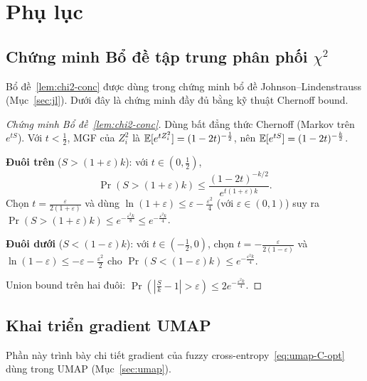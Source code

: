 \section{Phụ lục}

\subsection{Chứng minh Bổ đề tập trung phân phối $\chi^2$}
\label{app:chi2-proof}

Bổ đề~\ref{lem:chi2-conc} được dùng trong chứng minh bổ đề Johnson--Lindenstrauss (Mục~\ref{sec:jl}). Dưới đây là chứng minh đầy đủ bằng kỹ thuật Chernoff bound.

\begin{proof}[Chứng minh Bổ đề~\ref{lem:chi2-conc}]
Dùng bất đẳng thức Chernoff (Markov trên $e^{tS}$). Với $t < \frac{1}{2}$, MGF của $Z_i^2$ là $\mathbb{E}[e^{tZ_i^2}] = (1-2t)^{-\frac{1}{2}}$, nên $\mathbb{E}[e^{tS}] = (1-2t)^{-\frac{k}{2}}$.

\textbf{Đuôi trên} ($S > (1+\varepsilon)k$): với $t \in \left(0, \frac{1}{2}\right)$,
\[
\Pr(S > (1+\varepsilon)k) \leq \frac{(1-2t)^{-k/2}}{e^{t(1+\varepsilon)k}}.
\]
Chọn $t = \frac{\varepsilon}{2(1+\varepsilon)}$ và dùng $\ln(1+\varepsilon) \leq \varepsilon - \frac{\varepsilon^2}{4}$ (với $\varepsilon \in (0,1)$) suy ra $\Pr(S > (1+\varepsilon)k) \leq e^{-\frac{\varepsilon^2 k}{8}} \leq e^{-\frac{\varepsilon^2 k}{4}}$.

\textbf{Đuôi dưới} ($S < (1-\varepsilon)k$): với $t \in \left(-\frac{1}{2}, 0\right)$, chọn $t = -\frac{\varepsilon}{2(1-\varepsilon)}$ và $\ln(1-\varepsilon) \leq -\varepsilon - \frac{\varepsilon^2}{2}$ cho $\Pr(S < (1-\varepsilon)k) \leq e^{-\frac{\varepsilon^2 k}{4}}$.

Union bound trên hai đuôi: $\Pr\!\left(\left|\frac{S}{k} - 1\right| > \varepsilon\right) \leq 2 e^{-\frac{\varepsilon^2 k}{4}}$.
\end{proof}

\subsection{Khai triển gradient UMAP}
\label{app:umap-gradient}

Phần này trình bày chi tiết gradient của fuzzy cross-entropy~\eqref{eq:umap-C-opt} dùng trong UMAP (Mục~\ref{sec:umap}).

